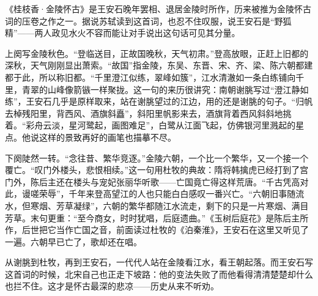 \begin{appreciation}
《桂枝香·金陵怀古》是王安石晚年罢相、退居金陵时所作，历来被推为金陵怀古词的压卷之作之一。据说苏轼读到这首词，也忍不住叹服，说王安石是“野狐精”——两人政见水火不容而能让对手说出这句话可见其分量。

上阕写金陵秋色。“登临送目，正故国晚秋，天气初肃。”登高放眼，正赶上旧都的深秋，天气刚刚显出萧索。“故国”指金陵，东吴、东晋、宋、齐、梁、陈六朝都建都于此，所以称旧都。“千里澄江似练，翠峰如簇”，江水清澈如一条白练铺向千里，青翠的山峰像箭镞一样聚拢。这一句的来历很讲究：南朝谢朓写过“澄江静如练”，王安石几乎是原样取来，站在谢朓望过的江边，用的还是谢朓的句子。“归帆去棹残阳里，背西风、酒旗斜矗”，斜阳里帆影来去，酒旗背着西风斜斜地挑着。“彩舟云淡，星河鹭起，画图难足”，白鹭从江面飞起，仿佛银河里溅起的星点。他说这样的景致再好的画笔也描摹不尽。

下阕陡然一转。“念往昔、繁华竞逐。”金陵六朝，一个比一个繁华，又一个接一个覆亡。“叹门外楼头，悲恨相续。”这一句用杜牧的典故：隋将韩擒虎已经打到了宫门外，陈后主还在楼头与宠妃张丽华听歌——亡国竟亡得这样荒唐。“千古凭高对此，谩嗟荣辱”，千年来登高望江的人也只能白白感叹一番兴亡。“六朝旧事随流水，但寒烟、芳草凝绿”，六朝的繁华都随江水流走，剩下的只是一片寒烟、满目芳草。末句更重：“至今商女，时时犹唱，后庭遗曲。”《玉树后庭花》是陈后主所作，后世把它当作亡国之音，前面读过杜牧的《泊秦淮》，王安石在这里又听见了一遍。六朝早已亡了，歌却还在唱。

从谢朓到杜牧，再到王安石，一代代人站在金陵看江水，看王朝起落。而王安石写这首词的时候，北宋自己也正走下坡路：他的变法失败了而他看得清清楚楚却什么也拦不住。这才是怀古最深的悲凉——历史从来不听劝。
\end{appreciation}
